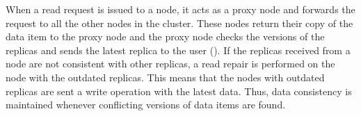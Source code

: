 		

When a read request is issued to a node,  it acts as a proxy node and forwards
the request to all the other nodes in the cluster.
These nodes return their copy of the data item to the proxy node and the proxy
node  checks the versions of the replicas and sends the latest replica to the
user  ().   If the replicas received from a node are not
consistent with other replicas, a read repair is performed on the node
with the outdated replicas.  This means that the nodes with outdated replicas
are sent a write operation with the latest data.
Thus,  data consistency is maintained whenever conflicting versions of data
items are found.



